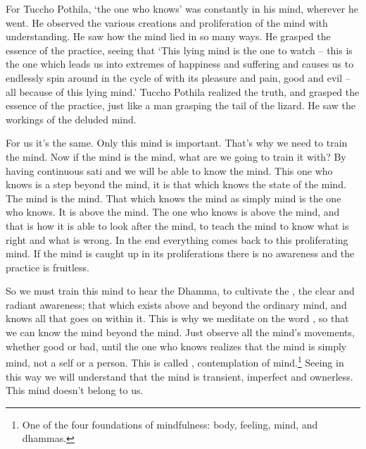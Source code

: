 For Tuccho Pothila, `the one who knows' was constantly in his mind, wherever he went. He observed the various creations and proliferation of the mind with understanding. He saw how the mind lied in so many ways. He grasped the essence of the practice, seeing that `This lying mind is the one to watch -- this is the one which leads us into extremes of happiness and suffering and causes us to endlessly spin around in the cycle of  with its pleasure and pain, good and evil -- all because of this lying mind.' Tuccho Pothila realized the truth, and grasped the essence of the practice, just like a man grasping the tail of the lizard. He saw the workings of the deluded mind.

For us it's the same. Only this mind is important. That's why we need to train the mind. Now if the mind is the mind, what are we going to train it with? By having continuous sati and  we will be able to know the mind. This one who knows is a step beyond the mind, it is that which knows the state of the mind. The mind is the mind. That which knows the mind as simply mind is the one who knows. It is above the mind. The one who knows is above the mind, and that is how it is able to look after the mind, to teach the mind to know what is right and what is wrong. In the end everything comes back to this proliferating mind. If the mind is caught up in its proliferations there is no awareness and the practice is fruitless.

So we must train this mind to hear the Dhamma, to cultivate the , the clear and radiant awareness; that which exists above and beyond the ordinary mind, and knows all that goes on within it. This is why we meditate on the word , so that we can know the mind beyond the mind. Just observe all the mind's movements, whether good or bad, until the one who knows realizes that the mind is simply mind, not a self or a person. This is called , contemplation of mind.\footnote{One of the four foundations of mindfulness: body, feeling, mind, and dhammas.} Seeing in this way we will understand that the mind is transient, imperfect and ownerless. This mind doesn't belong to us.

